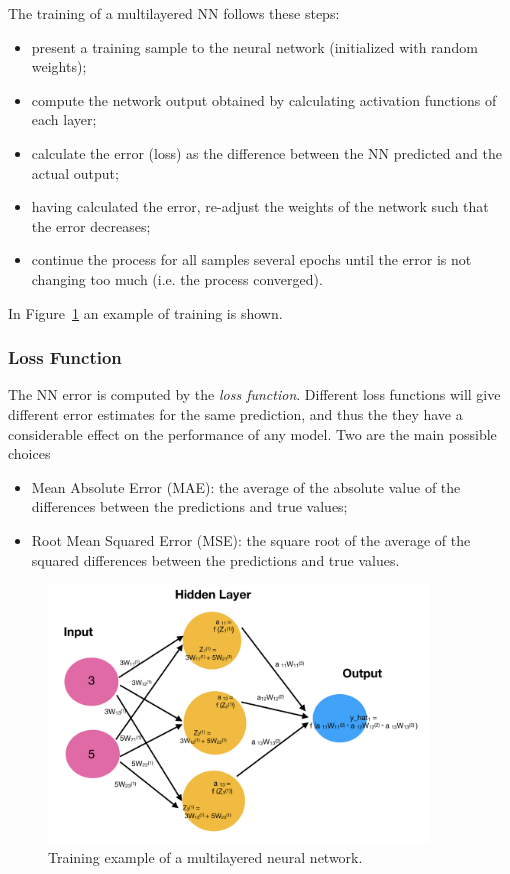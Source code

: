 The training of a multilayered NN follows these steps:

\begin{itemize}
	\tightlist
	\item
	present a training sample to the neural network (initialized with
	random weights);
	\item
	compute the network output obtained by calculating activation functions of each layer;
	\item
	calculate the error (loss) as the difference between the NN predicted
	and the actual output;
	\item
	having calculated the error, re-adjust the weights of the network such
	that the error decreases;
	\item
	continue the process for all samples several epochs until the
	error is not changing too much (i.e. the process converged).
\end{itemize}
In Figure~\ref{fig:training} an example of training is shown.

\subsubsection{Loss Function}
The NN error is computed by the \emph{loss function}. Different loss functions will give different error estimates for the same prediction, and thus the they have a considerable effect on the performance of any model. Two are the main possible choices

\begin{itemize}
	\tightlist
	\item
	Mean Absolute Error (MAE): the average of the absolute value of the
	differences between the predictions and true values;
	\item
	Root Mean Squared Error (MSE): the square root of the average of the
	squared differences between the predictions and true values.
\end{itemize}

\begin{figure}[htb]
	\centering
	\includegraphics[width=0.9\textwidth]{figures/training_nn}
	\caption{Training example of a multilayered neural network.}
	\label{fig:training}
\end{figure}


